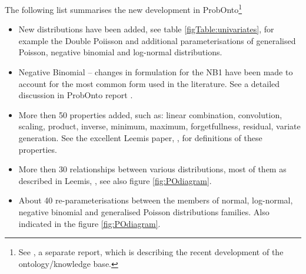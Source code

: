 The following list summarises the new development in ProbOnto\footnote{See \cite{ProbOnto:2015a}, a separate report, which is describing the recent development of the ontology/knowledge base.}
\begin{itemize}
\item 
New distributions have been added, see table \ref{figTable:univariates}, 
for example the Double Poiisson and additional parameterisations of 
generalised Poisson, negative binomial and log-normal distributions.
\item 
Negative Binomial -- changes in formulation for the NB1
have been made to account for the most common form used in the literature. 
See a detailed discussion in ProbOnto report \cite{ProbOnto:2015a}.
\item 
More then 50 properties added, such as: linear combination, convolution, 
scaling, product, inverse, minimum, maximum, forgetfullness, residual, 
variate generation. See the excellent Leemis paper, \cite{Leemis:2008tg}, 
for definitions of these properties.
\item 
More then 30 relationships between various distributions, most of them as 
described in Leemis, \cite{Leemis:2008tg}, see also figure \ref{fig:POdiagram}.
\item 
About 40 re-parameterisations between the members of normal, log-normal, 
negative binomial and generalised Poisson distributions families. Also indicated
in the figure \ref{fig:POdiagram}.
\end{itemize}


